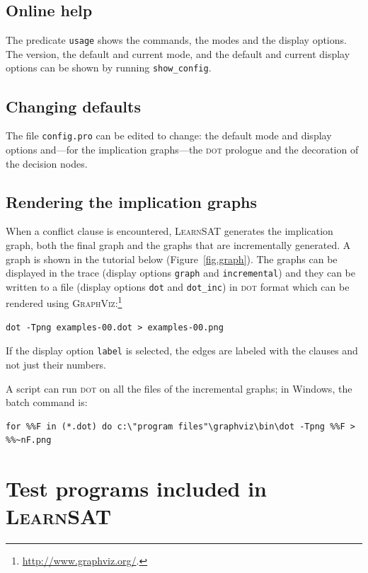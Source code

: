 \documentclass[11pt]{report}
\newcommand*{\p}[1]{\textup{\texttt{#1}}}
\newcommand*{\ls}{\textsc{LearnSAT}}
\newcommand*{\dt}{\textsc{dot}}
\begin{document}
\subsection{Online help}

The predicate \p{usage} shows the commands, the modes and the display
options. The version, the default and current mode, and the default and
current display options can be shown by running \p{show\_config}.

\subsection{Changing defaults}

The file \p{config.pro} can be edited to change: the default mode and
display options and---for the implication graphs---the \dt{} prologue and
the decoration of the decision nodes.


\subsection{Rendering the implication graphs}\label{s.impl}

When a conflict clause is encountered, \ls{} generates the implication
graph, both the final graph and the graphs that are incrementally
generated. A graph is shown in the tutorial below
(Figure~\ref{fig.graph}). The graphs can be displayed in the trace
(display options \p{graph} and \p{incremental}) and they can be written
to a file (display options \p{dot} and \p{dot\_inc}) in \dt{} format
which can be rendered using
\textsc{GraphViz}:\footnote{\url{http://www.graphviz.org/}.}

\begin{verbatim}
dot -Tpng examples-00.dot > examples-00.png
\end{verbatim}

If the display option \p{label} is selected, the edges are labeled with
the clauses and not just their numbers.

A script can run \dt{} on all the files of the incremental graphs; in Windows, the batch
command is:

\begin{verbatim}
for %%F in (*.dot) do c:\"program files"\graphviz\bin\dot -Tpng %%F > %%~nF.png
\end{verbatim}

\section{Test programs included in \ls{}}
\end{document}

